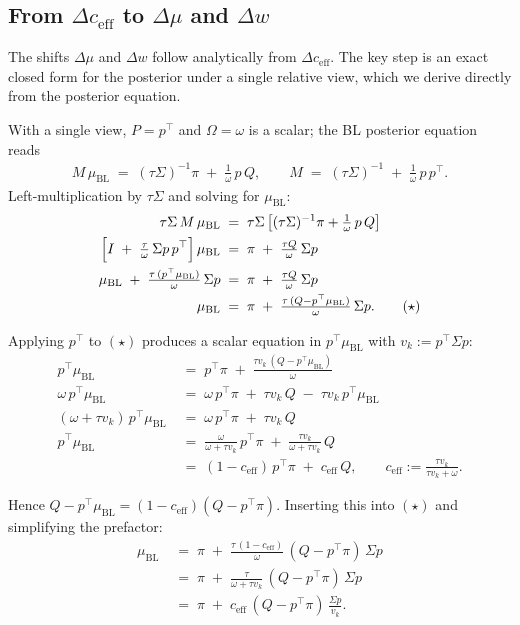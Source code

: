 \documentclass[a4paper,11pt]{article}
\theoremstyle{plain}
\theoremstyle{definition}
\newcommand{\muBL}{\mu_{\mathrm{BL}}}
\newcommand{\eff}{\mathrm{eff}}
\begin{document}
\subsection{From $\Delta c_{\eff}$ to $\Delta\mu$ and $\Delta w$}
\label{sec:dmu-dw}

The shifts $\Delta\mu$ and $\Delta w$ follow analytically from
$\Delta c_{\eff}$. The key step is an exact closed form for the
posterior under a single relative view, which we derive directly from
the posterior equation.

With a single view, $P = p^\top$ and $\Omega = \omega$ is a scalar; the
BL posterior equation reads
\begin{align*}
  M\,\muBL \;=\; (\tau\Sigma)^{-1}\pi \;+\; \tfrac{1}{\omega}\,p\,Q,
  \qquad M \;=\; (\tau\Sigma)^{-1} \;+\; \tfrac{1}{\omega}\,p\,p^\top.
\end{align*}
Left-multiplication by $\tau\Sigma$ and solving for $\muBL$:
\begin{align*}
  \tau\Sigma\,M\,\muBL \;&=\; \tau\Sigma\,\bigl[(\tau\Sigma)^{-1}\pi + \tfrac{1}{\omega}\,p\,Q\bigr]\\
  \Bigl[I \;+\; \tfrac{\tau}{\omega}\,\Sigma p\,p^\top\Bigr]\,\muBL \;&=\; \pi \;+\; \tfrac{\tau Q}{\omega}\,\Sigma p\\
  \muBL \;+\; \tfrac{\tau\,(p^\top\muBL)}{\omega}\,\Sigma p \;&=\; \pi \;+\; \tfrac{\tau Q}{\omega}\,\Sigma p\\
  \muBL \;&=\; \pi \;+\; \tfrac{\tau\,(Q - p^\top\muBL)}{\omega}\,\Sigma p.
  \tag{$\star$}
\end{align*}

Applying $p^\top$ to $(\star)$ produces a scalar equation in
$p^\top\muBL$ with $v_k := p^\top\Sigma p$:
\begin{align*}
  p^\top\muBL \;&=\; p^\top\pi \;+\; \tfrac{\tau v_k\,(Q - p^\top\muBL)}{\omega}\\
  \omega\,p^\top\muBL \;&=\; \omega\,p^\top\pi \;+\; \tau v_k\,Q \;-\; \tau v_k\,p^\top\muBL\\
  (\omega + \tau v_k)\,p^\top\muBL \;&=\; \omega\,p^\top\pi \;+\; \tau v_k\,Q\\
  p^\top\muBL \;&=\; \tfrac{\omega}{\omega + \tau v_k}\,p^\top\pi \;+\; \tfrac{\tau v_k}{\omega + \tau v_k}\,Q\\
  \;&=\; (1 - c_{\eff})\,p^\top\pi \;+\; c_{\eff}\,Q,
  \qquad c_{\eff} := \tfrac{\tau v_k}{\tau v_k + \omega}.
\end{align*}

Hence $Q - p^\top\muBL = (1-c_{\eff})(Q - p^\top\pi)$. Inserting this
into $(\star)$ and simplifying the prefactor:
\begin{align*}
  \muBL \;&=\; \pi \;+\; \tfrac{\tau\,(1 - c_{\eff})}{\omega}\,(Q - p^\top\pi)\,\Sigma p\\
  \;&=\; \pi \;+\; \tfrac{\tau}{\omega + \tau v_k}\,(Q - p^\top\pi)\,\Sigma p\\
  \;&=\; \pi \;+\; c_{\eff}\,(Q - p^\top\pi)\,\tfrac{\Sigma p}{v_k}.
\end{align*}
\end{document}
